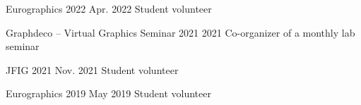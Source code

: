 

\begin{cventries}

  \cventry
    {Eurographics 2022} %
    {Apr. 2022} %
    {Student volunteer} %

  \cventry
    {Graphdeco -- Virtual Graphics Seminar 2021} %
    {2021} %
    {Co-organizer of a monthly lab seminar} %

  \cventry
    {JFIG 2021} %
    {Nov. 2021} %
    {Student volunteer} %

  \cventry
    {Eurographics 2019} %
    {May 2019} %
    {Student volunteer} %
    
\end{cventries}
